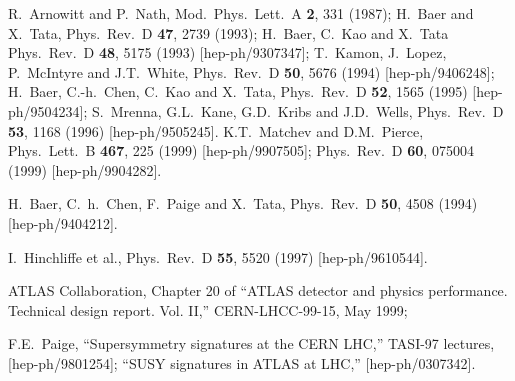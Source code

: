 \documentclass[12pt]{article}
\begin{document}
\begin{thebibliography}{999}
R.~Arnowitt and P.~Nath, 
  Mod.\ Phys.\ Lett.\ A {\bf 2}, 331 (1987);
H.~Baer and X.~Tata,
  Phys.\ Rev.\ D {\bf 47}, 2739 (1993);
H.~Baer, C.~Kao and X.~Tata
  Phys.\ Rev.\ D {\bf 48}, 5175 (1993)
  [hep-ph/9307347];
T.~Kamon, J.~Lopez, P.~McIntyre and J.T.~White, 
  Phys.\ Rev.\ D {\bf 50}, 5676 (1994)
  [hep-ph/9406248];
H.~Baer, C.-h.~Chen, C.~Kao and X.~Tata, 
  Phys.\ Rev.\ D {\bf 52}, 1565 (1995)
  [hep-ph/9504234];
S.~Mrenna, G.L.~Kane, G.D.~Kribs and J.D.~Wells,
  Phys.\ Rev.\ D {\bf 53}, 1168 (1996)
  [hep-ph/9505245].
K.T.~Matchev and D.M.~Pierce,
  Phys.\ Lett.\ B {\bf 467}, 225 (1999)
  [hep-ph/9907505];
  Phys.\ Rev.\ D {\bf 60}, 075004 (1999)
  [hep-ph/9904282].

H.~Baer, C.~h.~Chen, F.~Paige and X.~Tata,
  Phys.\ Rev.\ D {\bf 50}, 4508 (1994)
  [hep-ph/9404212].

I.~Hinchliffe et al., 
  Phys.\ Rev.\ D {\bf 55}, 5520 (1997)
  [hep-ph/9610544].

ATLAS Collaboration, 
  Chapter 20 of ``ATLAS detector and physics performance. 
  Technical design report.  Vol. II,'' CERN-LHCC-99-15, May 1999;

F.E.~Paige,
  ``Supersymmetry signatures at the CERN LHC,'' TASI-97 lectures,
  [hep-ph/9801254];
  ``SUSY signatures in ATLAS at LHC,''
  [hep-ph/0307342].


\end{thebibliography}
\end{document}
